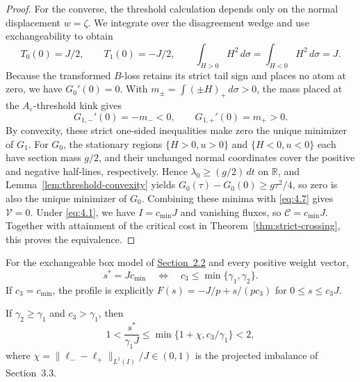 \begin{proof}
For the converse, the threshold calculation depends only on the normal displacement \(w=\zeta\). We integrate over the disagreement wedge and use exchangeability to obtain
\begin{equation}
T_0(0)=J/2,\qquad T_1(0)=-J/2,\qquad
\int_{H>0}H^2\,d\sigma=\int_{H<0}H^2\,d\sigma=J.
\tag{4.7}\label{eq:4.7}
\end{equation}
Because the transformed \(B\)-loss retains its strict tail sign and places no atom at zero, we have \(G_0'(0)=0\). With \(m_\pm=\int(\pm H)_+\,d\sigma>0\), the mass placed at the \(A_\varepsilon\)-threshold kink gives
\begin{equation}
G_{1,-}'(0)=-m_-<0,\qquad G_{1,+}'(0)=m_+>0.
\tag{4.8}\label{eq:4.8}
\end{equation}
By convexity, these strict one-sided inequalities make zero the unique minimizer of \(G_1\). For \(G_0\), the stationary regions \(\{H>0,u>0\}\) and \(\{H<0,u<0\}\) each have section mass \(g/2\), and their unchanged normal coordinates cover the positive and negative half-lines, respectively. Hence \(\lambda_0\ge(g/2)\,dt\) on \(\mathbb R\), and Lemma~\ref{lem:threshold-convexity} yields \(G_0(\tau)-G_0(0)\ge g\tau^2/4\), so zero is also the unique minimizer of \(G_0\). Combining these minima with \eqref{eq:4.7} gives \(\mathcal V=0\). Under \eqref{eq:4.1}, we have \(I=c_{\min}J\) and vanishing fluxes, so \(\mathcal C=c_{\min}J\). Together with attainment of the critical cost in Theorem~\ref{thm:strict-crossing}, this proves the equivalence.
\end{proof}

\begin{theorem}\label{thm:zero-premium} For the exchangeable box model of \mbox{\hyperref[model:critical-box]{Section~2.2}} and every positive weight vector,
\begin{equation}
s^*=Jc_{\min}\quad\Longleftrightarrow\quad
c_3\le\min\{\gamma_1,\gamma_2\}.
\tag{4.9}\label{eq:4.9}
\end{equation}
If \(c_3=c_{\min}\), the profile is explicitly \(F(s)=-J/p+s/(pc_3)\) for \(0\le s\le c_3J\).

If \(\gamma_2\ge\gamma_1\) and \(c_3>\gamma_1\), then
\begin{equation}
1<\frac{s^*}{\gamma_1J}\le\min\{1+\chi,c_3/\gamma_1\}<2,
\tag{4.10}\label{eq:4.10}
\end{equation}
where \(\chi=\|\ell_--\ell_+\|_{L^1(I)}/J\in(0,1)\) is the projected imbalance of Section~3.3.
\end{theorem}

